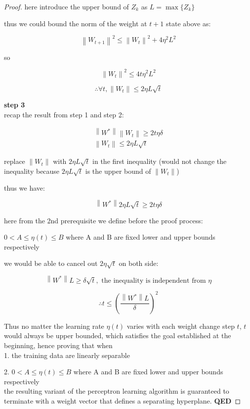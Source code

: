 \documentclass[11pt]{article}
\begin{document}
\begin{proof}
here introduce the upper bound of $Z_k$ as $L = \max \{ Z_k\}$

thus we could bound the norm of the weight at $t+1$ state above as:

$$\left \|  W_{t+1} \right \|^2 \le \left \|  W_{t} \right \|^2 + 4 \eta^2 L^2$$


so

$$\left \|  W_{t} \right \|^2 \le 4 t \eta^2 L^2$$

$$\therefore \forall t,  \left \|  W_{t} \right \| \le 2 \eta L \sqrt{t}$$



\textbf{step 3}\\

recap the result from step 1 and step 2:


\begin{equation}
\begin{aligned}
\left \| W^*\right \| \left \| W_t\right \|  \ge 2t \eta \delta \\
\left \|  W_{t} \right \| \le 2 \eta L \sqrt{t}
\end{aligned}
\end{equation}

replace $ \left \| W_t\right \| $ with $ 2 \eta L \sqrt{t}$ in the first inequality (would not change the inequality because $2 \eta L \sqrt{t}$ is the upper bound of $\left \| W_t\right \|$)


thus we have:


$$\left \| W^*\right \| 2 \eta L \sqrt{t} \ge 2 t \eta \delta$$


here from the 2nd prerequisite we define before the proof process:

$0<A \le \eta(t) \le  B$ where A and B are fixed lower and upper bounds respectively

we would be able to cancel out $2 \eta \sqrt{t}$ on both side:

$$\left \| W^*\right \|  L \ge \delta \sqrt{t}, \text{ the inequality is independent from } \eta $$



$$\therefore t \le \left(  \frac{\left \| W^* \right \|  L}{\delta} \right)^2$$

Thus no matter the learning rate $\eta(t)$ varies with each weight change step $t$, $t$ would always be upper bounded, which satisfies the goal established at the beginning, hence proving that when\\

1. the training data are linearly separable

2. $0<A \le \eta(t) \le  B$ where A and B are fixed lower and upper bounds respectively\\

the resulting variant of the perceptron learning algorithm is guaranteed to terminate with a weight vector that defines a separating hyperplane. \textbf{QED}


\end{proof}
\end{document}
